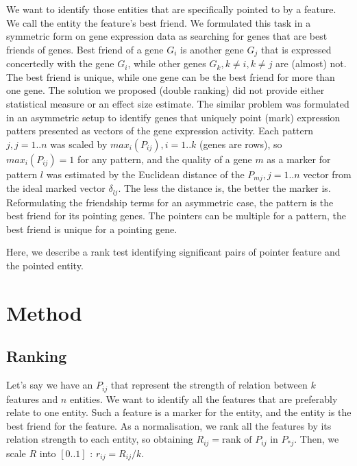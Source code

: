\documentclass{llncs}
\begin{document}
We want to identify those entities that are specifically pointed to by a feature. We call the entity the feature's best friend. We formulated \cite{best_friends:2015} this task in a symmetric form on gene expression data as searching for genes that are best friends of genes. Best friend of a gene $G_i$ is another gene $G_j$ that is expressed concertedly with the gene $G_i$, while other genes $G_k, k\neq i, k \neq j$ are (almost) not. The best friend is unique, while one gene can be the best friend for more than one gene. The solution we proposed (double ranking) did not provide either statistical measure or an effect size estimate. The similar problem was formulated in an asymmetric setup \cite{patternmarkers:2017} to identify genes that uniquely point (mark) expression patters presented as vectors of the gene expression activity. Each pattern $j, j=1..n$ was scaled by $max_i(P_{ij}),i=1..k$ (genes are rows), so $max_i(P_{ij})=1$ for any pattern, and the quality of a gene $m$ as a marker for pattern $l$ was estimated by the Euclidean distance of the $P_{mj}, j=1..n$ vector from the ideal marked vector $\delta_{lj}$. The less the distance is, the better the marker is. Reformulating the friendship terms \cite{best_friends:2015} for an asymmetric case, the pattern is the best friend for its pointing genes. The pointers can be multiple for a pattern, the best friend is unique for a pointing gene.

Here, we describe a rank test identifying significant pairs of pointer feature and the pointed entity.
%
\section{Method}
\subsection{Ranking}
Let's say we have an $P_{ij}$ that represent the strength of relation between $k$ features and $n$ entities. We want to identify all the features that are preferably relate to one entity. Such a feature is a marker for the entity, and the entity is the best friend for the feature.
As a normalisation, we rank all the features by its relation strength to each entity, so obtaining $R_{ij}= \textrm{rank of } P_{ij} \textrm{ in } P_{*j}$. Then, we scale $R$ into $[0..1]$ : $r_{ij}={R_{ij}}/{k}$.
\end{document}
